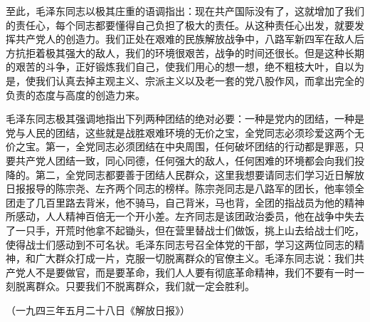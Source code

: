 至此，毛泽东同志以极其庄重的语调指出：现在共产国际没有了，这就增加了我们的责任心，每个同志都要懂得自己负担了极大的责任。从这种责任心出发，就要发挥共产党人的创造力。我们正处在艰难的民族解放战争中，八路军新四军在敌人后方抗拒着极其强大的敌人，我们的环境很艰苦，战争的时间还很长。但是这种长期的艰苦的斗争，正好锻炼我们自己，使我们用心的想一想，绝不粗枝大叶，自以为是，使我们认真去掉主观主义、宗派主义以及老一套的党八股作风，而拿出完全的负责的态度与高度的创造力来。


毛泽东同志极其强调地指出下列两种团结的绝对必要：一种是党内的团结，一种是党与人民的团结，这些就是战胜艰难环境的无价之宝，全党同志必须珍爱这两个无价之宝。第一，全党同志必须团结在中央周围，任何破坏团结的行动都是罪恶，只要共产党人团结一致，同心同德，任何强大的敌人，任何困难的环境都会向我们投降的。第二，全党同志都要善于团结人民群众，这里我想要请同志们学习近日解放日报报导的陈宗尧、左齐两个同志的榜样。陈宗尧同志是八路军的团长，他率领全团走了几百里路去背米，他不骑马，自己背米，马也背，全团的指战员为他的精神所感动，人人精神百倍无一个开小差。左齐同志是该团政治委员，他在战争中失去了一只手，开荒时他拿不起锄头，但在营里替战士们做饭，挑上山去给战士们吃，使得战士们感动到不可名状。毛泽东同志号召全体党的干部，学习这两位同志的精神，和广大群众打成一片，克服一切脱离群众的官僚主义。毛泽东同志说：我们共产党人不是要做官，而是要革命，我们人人要有彻底革命精神，我们不要有一时一刻脱离群众。只要我们不脱离群众，我们就一定会胜利。

（一九四三年五月二十八日《解放日报》）

